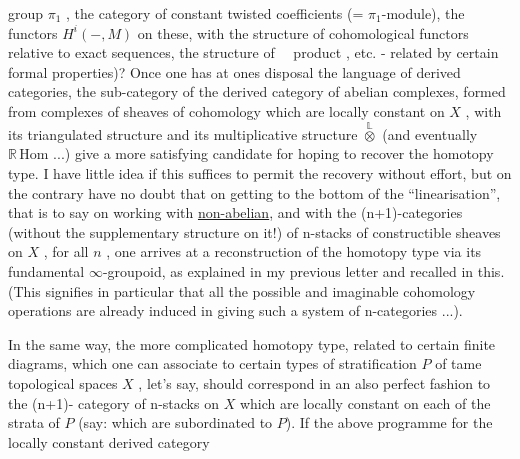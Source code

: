 
group $\pi_1$ , the category of constant twisted coefficients
(= $\pi_1$-module), the functors $H^i(-, M)$ on these, with the structure
of cohomological functors relative to exact sequences, the
structure of \ \ product , etc. - related by certain formal
properties)? Once one has at ones disposal the language of derived
categories, the sub-category of the derived category of abelian
complexes, formed from complexes of sheaves of cohomology which
are locally constant on $X$ , with its triangulated structure
and its multiplicative structure $\overset{\mathbb{L}}{\otimes}$ (and eventually $\mathbb{R}\,\mathrm{Hom}$ ...)
give a more satisfying candidate for hoping to recover the
homotopy type. I have little idea if this suffices to permit
the recovery without effort, but on the contrary have no doubt
that on getting to the bottom of the ``linearisation'', that is
to say on working with \uline{non-abelian}, and with the (n+1)-categories
(without the supplementary structure on it!) of n-stacks of
constructible sheaves on $X$ , for all $n$ , one arrives at a
reconstruction of the homotopy type via its fundamental $\infty$-groupoid,
as explained in my previous letter and recalled in this. (This
signifies in particular that all the possible and imaginable
cohomology operations are already induced in giving such a system
of n-categories ...).

In the same way, the more complicated homotopy type, related
to certain finite diagrams, which one can associate to certain
types of stratification $P$ of tame topological spaces $X$ , let's
say, should correspond in an also perfect fashion to the (n+1)-%
category of n-stacks on $X$ which are locally constant on each
of the strata of $P$ (say: which are subordinated to $P$).
If the above programme for the locally constant derived category

